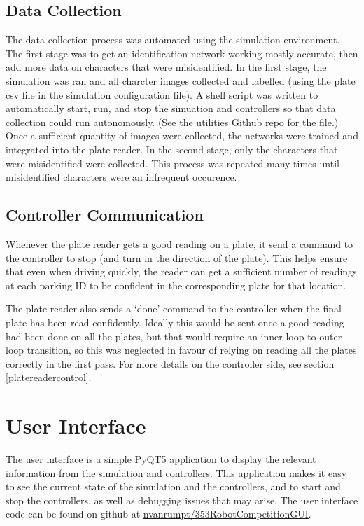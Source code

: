 \documentclass[titlepage, twocolumn]{article}
\begin{document}
\subsection{Data Collection}

The data collection process was automated using the simulation environment. The first stage was to get an identification network working mostly accurate, then add more data on characters that were misidentified. In the first stage, the simulation was ran and all charcter images collected and labelled (using the plate csv file in the simulation configuration file). A shell script was written to automatically start, run, and stop the simuation and controllers so that data collection could run autonomously. (See the utilities \href{https://github.com/nvanrumpt/robot_controller_utils2/blob/master/scripts/repeat_runsim.sh}{Github repo} for the file.) Once a sufficient quantity of images were collected, the networks were trained and integrated into the plate reader. In the second stage, only the characters that were misidentified were collected. This process was repeated many times until misidentified characters were an infrequent occurence.

\subsection{Controller Communication}

Whenever the plate reader gets a good reading on a plate, it send a command to the controller to stop (and turn in the direction of the plate). This helps ensure that even when driving quickly, the reader can get a sufficient number of readings at each parking ID to be confident in the corresponding plate for that location. 

The plate reader also sends a `done' command to the controller when the final plate has been read confidently. Ideally this would be sent once a good reading had been done on all the plates, but that would require an inner-loop to outer-loop transition, so this was neglected in favour of relying on reading all the plates correctly in the first pass. For more details on the controller side, see section \ref{platereadercontrol}.

\section{User Interface}

The user interface is a simple PyQT5 application to display the relevant information from the simulation and controllers. This application makes it easy to see the current state of the simulation and the controllers, and to start and stop the controllers, as well as debugging issues that may arise. The user interface code can be found on github at \href{https://github.com/nvanrumpt/353RobotCompetitionGUI}{nvanrumpt/353RobotCompetitionGUI}.
\end{document}
